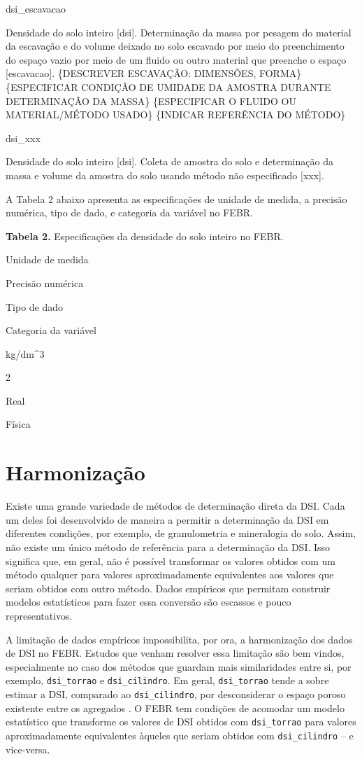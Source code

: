\documentclass[
]{book}
\begin{document}
dsi\_escavacao

Densidade do solo inteiro {[}dsi{]}. Determinação da massa por pesagem do material da escavação e do volume deixado no solo escavado por meio do preenchimento do espaço vazio por meio de um fluido ou outro material que preenche o espaço {[}escavacao{]}. \{DESCREVER ESCAVAÇÃO: DIMENSÕES, FORMA\} \{ESPECIFICAR CONDIÇÃO DE UMIDADE DA AMOSTRA DURANTE DETERMINAÇÃO DA MASSA\} \{ESPECIFICAR O FLUIDO OU MATERIAL/MÉTODO USADO\} \{INDICAR REFERÊNCIA DO MÉTODO\}

dsi\_xxx

Densidade do solo inteiro {[}dsi{]}. Coleta de amostra do solo e determinação da massa e volume da amostra do solo usando método não especificado {[}xxx{]}.

A Tabela 2 abaixo apresenta as especificações de unidade de medida, a precisão numérica, tipo de dado, e categoria da variável no FEBR.

\textbf{Tabela 2.} Especificações da densidade do solo inteiro no FEBR.

Unidade de medida

Precisão numérica

Tipo de dado

Categoria da variável

kg/dm\^{}3

2

Real

Física

\hypertarget{harmonizauxe7uxe3o}{%
\section{Harmonização}\label{harmonizauxe7uxe3o}}

Existe uma grande variedade de métodos de determinação direta da DSI. Cada um deles foi desenvolvido de maneira a permitir a determinação da DSI em diferentes condições, por exemplo, de granulometria e mineralogia do solo. Assim, não existe um único método de referência para a determinação da DSI. Isso significa que, em geral, não é possível transformar os valores obtidos com um método qualquer para valores aproximadamente equivalentes aos valores que seriam obtidos com outro método. Dados empíricos que permitam construir modelos estatísticos para fazer essa conversão são escassos e pouco representativos.

A limitação de dados empíricos impossibilita, por ora, a harmonização dos dados de DSI no FEBR. Estudos que venham resolver essa limitação são bem vindos, especialmente no caso dos métodos que guardam mais similaridades entre si, por exemplo, \texttt{dsi\_torrao} e \texttt{dsi\_cilindro}. Em geral, \texttt{dsi\_torrao} tende a sobre estimar a DSI, comparado ao \texttt{dsi\_cilindro}, por desconsiderar o espaço poroso existente entre os agregados \citep{CasanovaEtAl2016}. O FEBR tem condições de acomodar um modelo estatístico que transforme os valores de DSI obtidos com \texttt{dsi\_torrao} para valores aproximadamente equivalentes àqueles que seriam obtidos com \texttt{dsi\_cilindro} -- e vice-versa.
\end{document}

